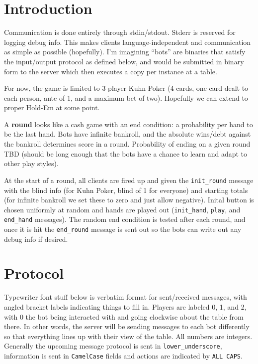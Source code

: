 \documentclass{article}
\begin{document}
\section{Introduction}
Communication is done entirely through stdin/stdout. Stderr is reserved
for logging debug info. This makes clients
language-independent and communication as simple as possible (hopefully).
I'm imagining ``bots'' are binaries that satisfy the input/output protocol
as defined below, and would be submitted in binary form to the server
which then executes a copy per instance at a table.

For now, the game is limited to 3-player Kuhn Poker (4-cards, one card dealt
to each person, ante of 1, and a maximum bet of two). Hopefully we can extend to
proper Hold-Em at some point.

A \textbf{round} looks like a cash game with an end condition: a probability
per hand to be the last hand.
Bots have infinite bankroll, and the absolute wins/debt against the bankroll determines
score in a round. Probability of ending on a given round TBD (should be
long enough that the bots have a chance to learn and adapt to other play styles).

At the start of a round, all clients are fired up and given the \texttt{init\_round}
message with the blind info (for Kuhn Poker, blind of 1 for everyone) and starting totals
(for infinite bankroll we set these to zero and just allow negative).
Inital button is chosen uniformly
at random and hands are played out (\texttt{init\_hand}, \texttt{play}, and
\texttt{end\_hand} messages). The random end condition is tested after
each round, and once it is hit the \texttt{end\_round} message is sent out
so the bots can write out any debug info if desired.

\section{Protocol}
Typewriter font stuff below is verbatim format for sent/received messages,
with angled bracket labels indicating things to fill in. Players are labeled
0, 1, and 2, with 0 the bot being interacted with and going clockwise
about the table from there. In other words, the server will be sending
messages to each bot differently so that everything lines up with their view
of the table. All numbers are integers. Generally the upcoming message protocol
is sent in \texttt{lower\_underscore}, information is
sent in \texttt{CamelCase} fields and
actions are indicated by \texttt{ALL CAPS}.
\end{document}
